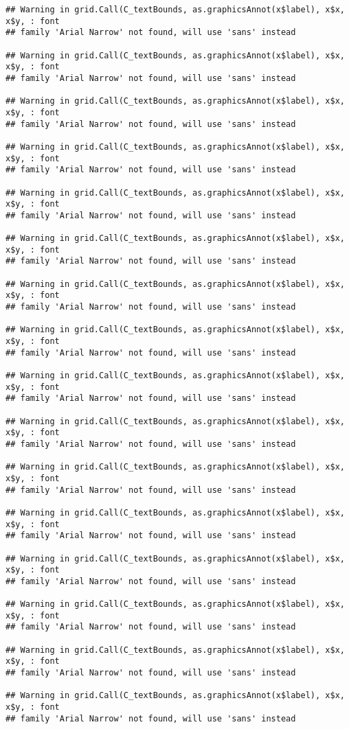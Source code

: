 \documentclass[
]{article}
\begin{document}
\begin{verbatim}
## Warning in grid.Call(C_textBounds, as.graphicsAnnot(x$label), x$x, x$y, : font
## family 'Arial Narrow' not found, will use 'sans' instead

## Warning in grid.Call(C_textBounds, as.graphicsAnnot(x$label), x$x, x$y, : font
## family 'Arial Narrow' not found, will use 'sans' instead

## Warning in grid.Call(C_textBounds, as.graphicsAnnot(x$label), x$x, x$y, : font
## family 'Arial Narrow' not found, will use 'sans' instead

## Warning in grid.Call(C_textBounds, as.graphicsAnnot(x$label), x$x, x$y, : font
## family 'Arial Narrow' not found, will use 'sans' instead

## Warning in grid.Call(C_textBounds, as.graphicsAnnot(x$label), x$x, x$y, : font
## family 'Arial Narrow' not found, will use 'sans' instead

## Warning in grid.Call(C_textBounds, as.graphicsAnnot(x$label), x$x, x$y, : font
## family 'Arial Narrow' not found, will use 'sans' instead

## Warning in grid.Call(C_textBounds, as.graphicsAnnot(x$label), x$x, x$y, : font
## family 'Arial Narrow' not found, will use 'sans' instead

## Warning in grid.Call(C_textBounds, as.graphicsAnnot(x$label), x$x, x$y, : font
## family 'Arial Narrow' not found, will use 'sans' instead

## Warning in grid.Call(C_textBounds, as.graphicsAnnot(x$label), x$x, x$y, : font
## family 'Arial Narrow' not found, will use 'sans' instead

## Warning in grid.Call(C_textBounds, as.graphicsAnnot(x$label), x$x, x$y, : font
## family 'Arial Narrow' not found, will use 'sans' instead

## Warning in grid.Call(C_textBounds, as.graphicsAnnot(x$label), x$x, x$y, : font
## family 'Arial Narrow' not found, will use 'sans' instead

## Warning in grid.Call(C_textBounds, as.graphicsAnnot(x$label), x$x, x$y, : font
## family 'Arial Narrow' not found, will use 'sans' instead

## Warning in grid.Call(C_textBounds, as.graphicsAnnot(x$label), x$x, x$y, : font
## family 'Arial Narrow' not found, will use 'sans' instead

## Warning in grid.Call(C_textBounds, as.graphicsAnnot(x$label), x$x, x$y, : font
## family 'Arial Narrow' not found, will use 'sans' instead

## Warning in grid.Call(C_textBounds, as.graphicsAnnot(x$label), x$x, x$y, : font
## family 'Arial Narrow' not found, will use 'sans' instead

## Warning in grid.Call(C_textBounds, as.graphicsAnnot(x$label), x$x, x$y, : font
## family 'Arial Narrow' not found, will use 'sans' instead
\end{verbatim}
\end{document}
